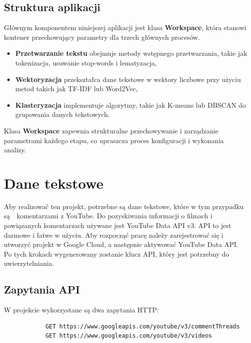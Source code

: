 	\subsection{Struktura aplikacji}
		Głównym komponentem niniejszej aplikacji jest klasa \textbf{Workspace}, która stanowi kontener przechowujący parametry dla trzech głównych procesów.
		\begin{itemize}
			\item \textbf{Przetwarzanie tekstu} obejmuje metody wstępnego przetwarzania, takie jak tokenizacja, usuwanie stop-words i lematyzacja,
			\item \textbf{Wektoryzacja} przekształca dane tekstowe w wektory liczbowe przy użyciu metod takich jak TF-IDF lub Word2Vec,
			\item \textbf{Klasteryzacja} implementuje algorytmy, takie jak K-means lub DBSCAN do grupowania danych tekstowych.
		\end{itemize}
		Klasa \textbf{Workspace} zapewnia strukturalne przechowywanie i zarządzanie parametrami każdego etapu, co upraszcza proces konfiguracji i wykonania analizy.
		
	
\section{Dane tekstowe}

	Aby realizować ten projekt, potrzebne są dane tekstowe, które w tym przypadku są~~komentarzami z YouTube. Do pozyskiwania informacji o filmach i powiązanych komentarzach używane jest YouTube Data API v3. API to jest darmowe i łatwe w użyciu. Aby rozpocząć pracę należy zarejestrować się i utworzyć projekt w Google Cloud, a następnie aktywować YouTube Data API. Po tych krokach wygenerowany zostanie klucz API, który jest potrzebny do uwierzytelniania.
		
	\subsection{Zapytania API}
		W projekcie wykorzystane są dwa zapytania HTTP:
		
		\begin{verbatim}
			GET https://www.googleapis.com/youtube/v3/commentThreads
			GET https://www.googleapis.com/youtube/v3/videos
		\end{verbatim}
		

